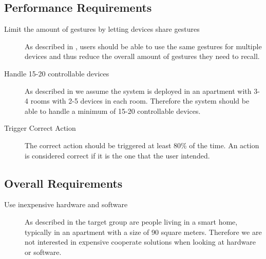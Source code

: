 
\subsection{Performance Requirements}

\begin{description}
\item[Limit the amount of gestures by letting devices share gestures] As described in , users should be able to use the same gestures for multiple devices and thus reduce the overall amount of gestures they need to recall.
\item[Handle 15-20 controllable devices] As described in  we assume the system is deployed in an apartment with 3-4 rooms with 2-5 devices in each room. Therefore the system should be able to handle a minimum of 15-20 controllable devices.
\item[Trigger Correct Action] The correct action should be triggered at least 80\% of the time. An action is considered correct if it is the one that the user intended.
\end{description}

\subsection{Overall Requirements}

\begin{description}
\item[Use inexpensive hardware and software] As described in  the target group are people living in a smart home, typically in an apartment with a size of 90 square meters. Therefore we are not interested in expensive cooperate solutions when looking at hardware or software.
\end{description}

